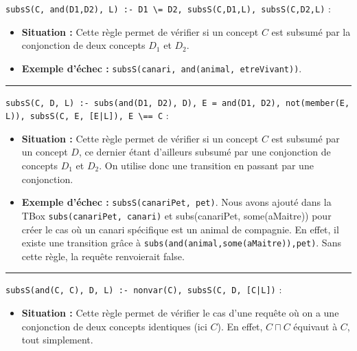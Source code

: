 \documentclass[a4paper,12pt]{report}
\begin{document}
\begin{tcolorbox}[colback=gray!10, colframe=blue!30, coltitle=black, title=Réponse à la question 3.2 - 1/2]

    \texttt{subsS(C, and(D1,D2), L) :- D1 \textbackslash= D2, subsS(C,D1,L), subsS(C,D2,L)} :\\[-0.4cm]
    \begin{itemize}
        \item \textbf{Situation :} Cette règle permet de vérifier si un concept \(C\) est subsumé par la conjonction de deux concepts \(D_1\) et \(D_2\).
        
        \vspace{0.1cm}
        \item \textbf{Exemple d'échec :} \texttt{subsS(canari, and(animal, etreVivant))}.
    \end{itemize}


    \vspace{0.5cm}
    \hrule
    \vspace{0.5cm}


    \texttt{subsS(C, D, L) :- subs(and(D1, D2), D), E = and(D1, D2), not(member(E, L)), subsS(C, E, [E|L]), E \textbackslash== C} :\\[-0.4cm]
    \begin{itemize}
        \item \textbf{Situation :} Cette règle permet de vérifier si un concept \(C\) est subsumé par un concept \(D\), ce dernier étant d'ailleurs subsumé par une 
            conjonction de concepts \(D_1\) et \(D_2\). On utilise donc une transition en passant par une conjonction.
        
        \vspace{0.1cm}
        \item \textbf{Exemple d'échec :} \texttt{subsS(canariPet, pet)}. Nous avons ajouté dans la TBox \texttt{subs(canariPet, canari)} et subs(canariPet, some(aMaitre))
            pour créer le cas où un canari spécifique est un animal de compagnie. En effet, il existe une transition grâce à \texttt{subs(and(animal,some(aMaitre)),pet)}.
            Sans cette règle, la requête renvoierait false.
    \end{itemize}
    

    \vspace{0.5cm}
    \hrule
    \vspace{0.5cm}


    \texttt{subsS(and(C, C), D, L) :- nonvar(C), subsS(C, D, [C|L])} :
    \begin{itemize}
        \item \textbf{Situation :} Cette règle permet de vérifier le cas d'une requête où on a une conjonction de deux concepts identiques (ici \(C\)). En effet, \(C \sqcap C\) 
            équivaut à \(C\), tout simplement.
        

\end{itemize}
\end{tcolorbox}
\end{document}
